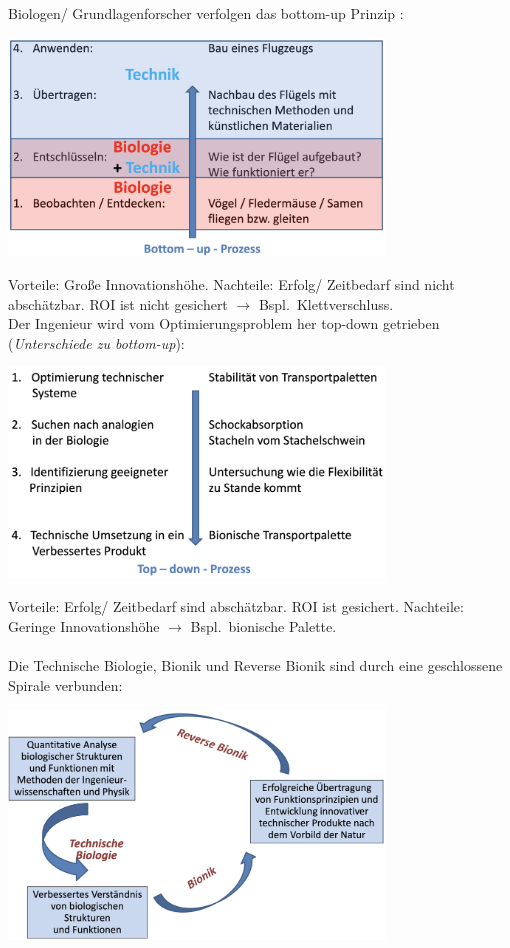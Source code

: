 Biologen/ Grundlagenforscher verfolgen das bottom-up Prinzip \dangersign:
\begin{center}
	\includegraphics[width=10cm]{lec1/figures/Forschungsprinzip.png}	
\end{center}
Vorteile: Große Innovationshöhe. Nachteile: Erfolg/ Zeitbedarf sind nicht abschätzbar. ROI ist nicht gesichert $\rightarrow$ Bspl.\ Klettverschluss.\\
Der Ingenieur wird vom Optimierungsproblem her top-down getrieben (\dangersign \textit{Unterschiede zu bottom-up}):

\begin{center}
	\includegraphics[width=10cm]{lec1/figures/top-down.png}
\end{center}
Vorteile: Erfolg/ Zeitbedarf sind abschätzbar. ROI ist gesichert. Nachteile: Geringe Innovationshöhe $\rightarrow$ Bspl.\ 
bionische Palette.\\
\\
Die Technische Biologie, Bionik und Reverse Bionik sind durch eine geschlossene Spirale verbunden:
\begin{center}
	\includegraphics[width=10cm]{lec1/figures/spirale.png}
\end{center}

